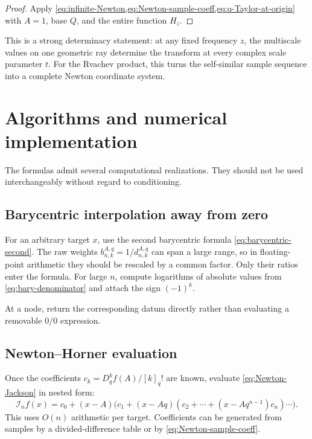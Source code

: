 \documentclass[11pt,oneside]{article}
\numberwithin{equation}{section}
\theoremstyle{definition}
\theoremstyle{remark}
\newcommand{\Ic}{\mathcal I}
\begin{document}
\begin{proof}
Apply \cref{eq:infinite-Newton,eq:Newton-sample-coeff,eq:q-Taylor-at-origin}
with $A=1$, base $Q$, and the entire function $H_z$.
\end{proof}

This is a strong determinacy statement: at any fixed frequency $z$, the
multiscale values on one geometric ray determine the transform at every complex
scale parameter $t$.  For the Rvachev product, this turns the self-similar
sample sequence into a complete Newton coordinate system.

\section{Algorithms and numerical implementation}
\label{sec:algorithms}

The formulas admit several computational realizations.  They should not be
used interchangeably without regard to conditioning.

\subsection{Barycentric interpolation away from zero}

For an arbitrary target $x$, use the second barycentric formula
\eqref{eq:barycentric-second}.  The raw weights
$b_{n,k}^{A,q}=1/d_{n,k}^{A,q}$ can span a large range, so in floating-point
arithmetic they should be rescaled by a common factor.  Only their ratios enter
the formula.  For large $n$, compute logarithms of absolute values from
\eqref{eq:bary-denominator} and attach the sign $(-1)^k$.

At a node, return the corresponding datum directly rather than evaluating a
removable $0/0$ expression.

\subsection{Newton--Horner evaluation}

Once the coefficients
$c_k=D_q^kf(A)/[k]_q!$ are known, evaluate
\eqref{eq:Newton-Jackson} in nested form:
\begin{equation}
 \Ic_nf(x)=c_0+(x-A)\bigl(c_1+(x-Aq)
 (c_2+\cdots+(x-Aq^{n-1})c_n)\cdots\bigr).
 \label{eq:Newton-Horner}
\end{equation}
This uses $O(n)$ arithmetic per target.  Coefficients can be generated from
samples by a divided-difference table or by \eqref{eq:Newton-sample-coeff}.
\end{document}
